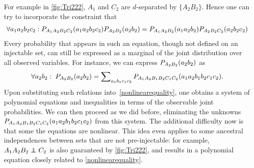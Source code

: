 {For example in \cref{fig:Tri222}, $A_1$ and $C_2$ are $d$-separated by $\{A_2 B_2\}$. Hence one can try to incorporate the constraint that 
\begin{align}\label{nonlinearequality}
\forall{a_1 a_2 b_2 c_2}: \p[A_1 A_2 B_2 C_2]{a_1 a_2 b_2 c_2}\p[A_2 B_2]{a_2 b_2}=\p[A_1 A_2 B_2]{a_1 a_2 b_2}\p[A_2 B_2 C_2]{a_2 b_2 c_2}
\end{align}
 Every probability that appears in such an equation, though not defined on an injectable set, can still be expressed as a marginal of the joint distribution over all observed variables.  For instance, we can express $\p[A_2 B_2]{a_2 b_2}$ as
\begin{align}
\forall{a_2 b_2}:\;\pdf[A_2 B_2]{a_2 b_2} = \sum\nolimits_{a_1 b_1 c_1 c_2}\pdf[A_1 A_2 B_1 B_2 C_1 C_2]{a_1 a_2 b_1 b_2 c_1 c_2}.
\end{align}
Upon substituting such relations into~\cref{nonlinearequality}, one obtains a system of polynomial equations and inequalities in terms of the observable joint probabilities.  We can then proceed as we did before, eliminating the unknowns $\pdf[A_1 A_2 B_1 B_2 C_1 C_2]{a_1 a_2 b_1 b_2 c_1 c_2}$ from this system. The additional difficulty now is that some the equations are nonlinear. This idea even applies to some ancestral independences between sets that are not pre-injectable: for example, $A_1 A_2 B_2 \indep C_2$ is also guaranteed by \cref{fig:Tri222}, and results in a polynomial equation closely related to \cref{nonlinearequality}.

}
